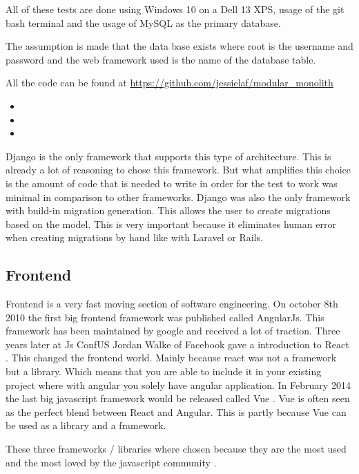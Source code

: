 All of these tests are done using Windows 10 on a Dell 13 XPS, usage of the git bash terminal and the usage of MySQL as the primary database.

The assumption is made that the data base exists where root is the username and password and the web framework used is the name of the database table.

All the code can be found at \url{https://github.com/jessielaf/modular_monolith}

\begin{itemize}
    \item {}
    \item {}
    \item {}
\end{itemize}

Django is the only framework that supports this type of architecture. This is already a lot of reasoning to chose this framework. But what amplifies this choice is the amount of code that is needed to write in order for the test to work was minimal in comparison to other frameworks. Django was also the only framework with build-in migration generation. This allows the user to create migrations based on the model. This is very important because it eliminates human error when creating migrations by hand like with Laravel or Rails.

\subsection{Frontend}

Frontend is a very fast moving section of software engineering. On october 8th 2010 \cite{angularJs} the first big frontend framework was published called AngularJs. This framework has been maintained by google and received a lot of traction. Three years later at Js ConfUS Jordan Walke of Facebook gave a introduction to React \cite{reactJs}. This changed the frontend world. Mainly because react was not a framework but a library. Which means that you are able to include it in your existing project where with angular you solely have angular application. In February 2014 the last big javascript framework would be released called Vue \cite{vueJs}. Vue is often seen as the perfect blend between React and Angular. This is partly because Vue can be used as a library and a framework.

These three frameworks / libraries where chosen because they are the most used and the most loved by the javascript community \cite{allFrontendFrameworks}.

